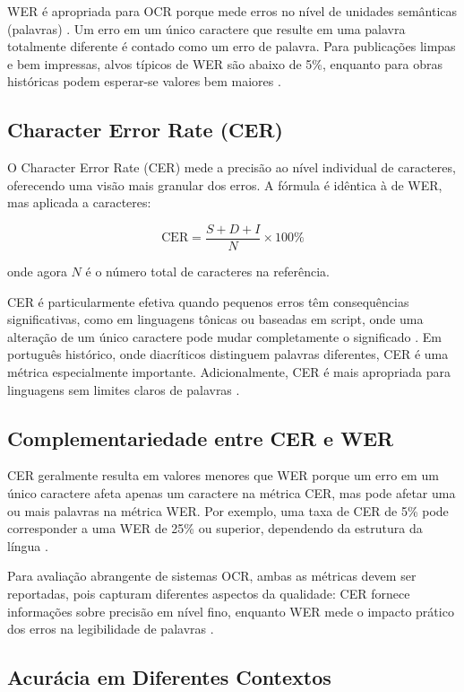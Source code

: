 \documentclass[
  12pt,
  oneside,
  a4paper,
  chapter=TITLE,
  section=TITLE,
  english,
  brazil
]{abntex2}
\begin{document}
WER é apropriada para OCR porque mede erros no nível de unidades semânticas
(palavras) \cite{ScienceDirect2025}. Um erro em um único caractere que resulte em uma
palavra totalmente diferente é contado como um erro de palavra. Para publicações limpas
e bem impressas, alvos típicos de WER são abaixo de 5\%, enquanto para obras históricas
podem esperar-se valores bem maiores \cite{DocuClipper2025}.

\subsection{Character Error Rate (CER)}

O Character Error Rate (CER) mede a precisão ao nível individual de caracteres,
oferecendo uma visão mais granular dos erros. A fórmula é idêntica à de WER, mas
aplicada a caracteres:

\[
\text{CER} = \frac{S + D + I}{N} \times 100\%
\]

onde agora $N$ é o número total de caracteres na referência.

CER é particularmente efetiva quando pequenos erros têm consequências significativas,
como em linguagens tônicas ou baseadas em script, onde uma alteração de um único
caractere pode mudar completamente o significado \cite{Galileo2025}. Em português
histórico, onde diacríticos distinguem palavras diferentes, CER é uma métrica
especialmente importante. Adicionalmente, CER é mais apropriada para linguagens sem
limites claros de palavras \cite{Advocating2025}.

\subsection{Complementariedade entre CER e WER}

CER geralmente resulta em valores menores que WER porque um erro em um único caractere
afeta apenas um caractere na métrica CER, mas pode afetar uma ou mais palavras na métrica
WER. Por exemplo, uma taxa de CER de 5\% pode corresponder a uma WER de 25\% ou superior,
dependendo da estrutura da língua \cite{WaterCrawl2025}.

Para avaliação abrangente de sistemas OCR, ambas as métricas devem ser reportadas, pois
capturam diferentes aspectos da qualidade: CER fornece informações sobre precisão em nível
fino, enquanto WER mede o impacto prático dos erros na legibilidade de
palavras \cite{TowardsDataScience2025}.

\subsection{Acurácia em Diferentes Contextos}
\end{document}
